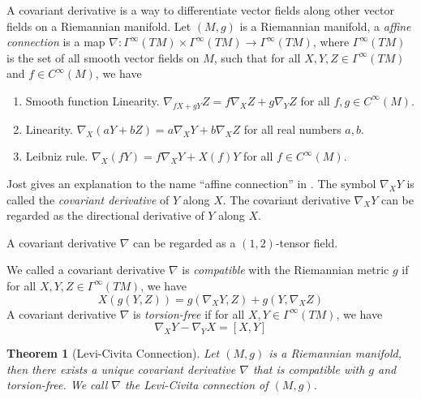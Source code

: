 \documentclass[12pt,a4paper,draft]{article}  %
\newcounter{cite}
\newtheorem{theorem}{Theorem}[section]
\theoremstyle{definition}
\numberwithin{equation}{section}
\begin{document}
A covariant derivative is a way to differentiate vector fields along other vector fields on a Riemannian manifold. Let $(M,g)$ is a Riemannian manifold, a \emph{affine connection} is a map $\nabla: \Gamma^\infty(TM) \times \Gamma^\infty(TM) \to \Gamma^\infty(TM)$, where $\Gamma^\infty(TM)$ is the set of all smooth vector fields on $M$, such that for all $X,Y,Z \in \Gamma^\infty(TM)$ and $f\in C^\infty(M)$, we have
\begin{enumerate}
        \item Smooth function Linearity. $\nabla_{fX + gY} Z = f \nabla_X Z + g \nabla_Y Z$ for all $f,g \in C^\infty(M)$.
        \item Linearity. $\nabla_X (aY + bZ) = a\nabla_X Y + b\nabla_X Z$ for all real numbers $a,b$.
        \item Leibniz rule. $\nabla_X (fY) = f \nabla_X Y + X(f) Y$ for all $f \in C^\infty(M)$.
\end{enumerate}
Jost gives an explanation to the name ``affine connection'' in \cite{Jost2017}. The symbol $\nabla_XY$ is called the \emph{covariant derivative} of $Y$ along $X$. The covariant derivative $\nabla_X Y$ can be regarded as the directional derivative of $Y$ along $X$.

A covariant derivative $\nabla$ can be regarded as a $(1,2)$-tensor field. 

We called a covariant derivative $\nabla$ is \emph{compatible} with the Riemannian metric $g$ if for all $X,Y,Z \in \Gamma^\infty(TM)$, we have
\[
X(g(Y,Z)) = g(\nabla_X Y, Z) + g(Y, \nabla_X Z)
\]
A covariant derivative $\nabla$ is \emph{torsion-free} if for all $X,Y \in \Gamma^\infty(TM)$, we have
\[
\nabla_X Y - \nabla_Y X = [X,Y]
\]
\begin{theorem}[Levi-Civita Connection]
        Let $(M,g)$ is a Riemannian manifold, then there exists a unique covariant derivative $\nabla$ that is compatible with $g$ and torsion-free. We call $\nabla$ the \emph{Levi-Civita connection} of $(M,g)$.        
\end{theorem}
\end{document}
